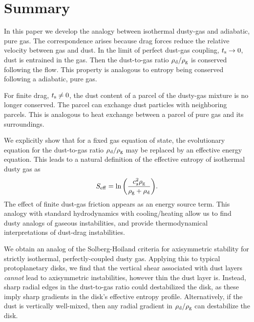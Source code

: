 

\section{Summary}\label{summary}
In this paper we develop the analogy between isothermal 
dusty-gas and adiabatic, pure gas. The correspondence arises
because drag forces reduce the relative velocity between gas and
dust. In the limit of perfect dust-gas coupling, $t_\mathrm{s} \to 0$,  
 dust is entrained in 
the gas. Then the dust-to-gas ratio $\rho_\mathrm{d}/\rho_\mathrm{g}$ is conserved
following the flow. This property is analogous to entropy being conserved
following a adiabatic, pure gas. 

For finite drag, $t_\mathrm{s}\neq 0$, the dust content of a 
parcel of the dusty-gas mixture is no longer conserved. The parcel 
can exchange dust particles with neighboring parcels. %
This is analogous to heat exchange between a parcel of pure gas and
its surroundings.    

We explicitly show that for a fixed gas equation of state, the  
evolutionary equation for the dust-to-gas ratio $\rho_\mathrm{d}/\rho_\mathrm{g}$ may be replaced by an 
effective energy equation. This leads to a 
natural definition of the effective entropy of isothermal dusty gas as  
\begin{align*}
  S_\mathrm{eff}  = \ln{\left(\frac{c_s^2\rho_\mathrm{g}}{\rho_\mathrm{g}+\rho_\mathrm{d}}\right)}.  
\end{align*}
The effect of finite dust-gas friction appears as an energy
source term.  This analogy with standard 
hydrodynamics with cooling/heating allow us to find dusty analogs of gaseous
instabilities, and provide thermodynamical interpretations of  
dust-drag instabilities. 


We obtain an analog of the Solberg-Hoiland criteria for
axisymmetric stability for strictly isothermal, perfectly-coupled dusty gas.  
Applying this to typical protoplanetary disks, we find that 
the vertical shear associated with dust 
 layers \emph{cannot} lead to axisymmetric  
  instabilities, however thin the dust layer is.    
Instead, sharp radial  edges in the dust-to-gas ratio could destabilized the
disk, as these imply sharp gradients in the disk's effective entropy
profile. Alternatively, if the dust is vertically well-mixed, then any
radial gradient in $\rho_\mathrm{d}/\rho_\mathrm{g}$ can destabilize the disk. 

